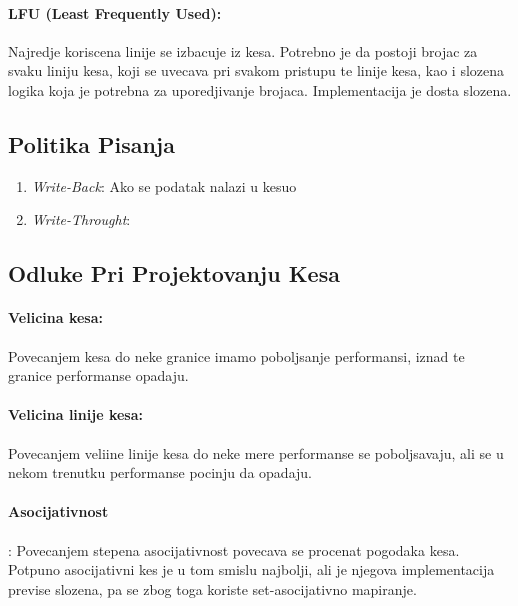 \documentclass[12p,a4paper]{article}
\begin{document}
\begin{multicols}{2}
    \paragraph{LFU (Least Frequently Used):}
    Najredje koriscena linije se izbacuje iz kesa. Potrebno je da postoji
    brojac za svaku liniju kesa, koji se uvecava pri svakom pristupu te 
    linije kesa, kao i slozena logika koja je potrebna za uporedjivanje
    brojaca. Implementacija je dosta slozena.

    \subsection{Politika Pisanja}

    \begin{enumerate}
        \itemsep0em
        \item \emph{Write-Back}: Ako se podatak nalazi u kesuo
        \item \emph{Write-Throught}:  
    \end{enumerate}

    \subsection{Odluke Pri Projektovanju Kesa}

    \paragraph{Velicina kesa:}
    Povecanjem kesa do neke granice imamo poboljsanje performansi, iznad
    te granice performanse opadaju.

    \paragraph{Velicina linije kesa:}
    Povecanjem veliine linije kesa do neke mere performanse se poboljsavaju,
    ali se u nekom trenutku performanse pocinju da opadaju.

    \paragraph{Asocijativnost}:
    Povecanjem stepena asocijativnost povecava se procenat pogodaka kesa.
    Potpuno asocijativni kes je u tom smislu najbolji, ali je njegova
    implementacija previse slozena, pa se zbog toga koriste set-asocijativno
    mapiranje.
    
    
    

\end{multicols}
\end{document}
